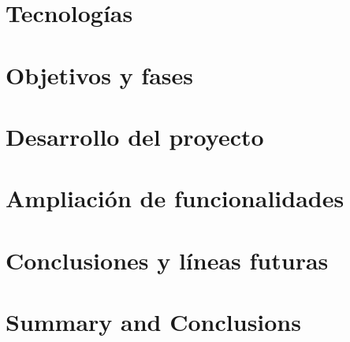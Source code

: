 \documentclass[spanish,a4paper,14pt,oneside]{extreport}
\begin{document}
\chapter{Tecnologías}
\label{chapter:tres}




\chapter{Objetivos y fases}
\label{chapter:cuatro}



\newpage{\pagestyle{empty}}
\thispagestyle{empty}

\chapter{Desarrollo del proyecto}
\label{chapter:cinco}



\newpage{\pagestyle{empty}}
\thispagestyle{empty}

\chapter{Ampliación de funcionalidades }
\label{chapter:seis}



\newpage{\pagestyle{empty}}
\thispagestyle{empty}

\chapter{Conclusiones y líneas futuras }
\label{chapter:Conclusiones}



\newpage{\pagestyle{empty}}
\thispagestyle{empty}

\chapter{Summary and Conclusions }
\label{chapter:ingles}
\end{document}
